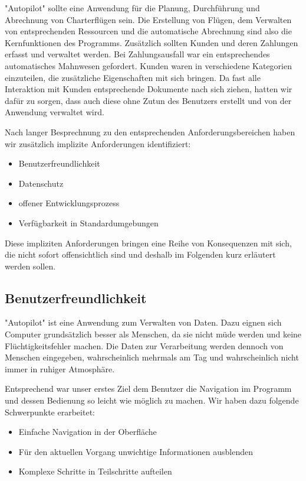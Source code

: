\documentclass[12pt]{article}
\begin{document}
"Autopilot" sollte eine Anwendung für die Planung, Durchführung und Abrechnung von Charterflügen sein. Die Erstellung von Flügen, dem Verwalten von entsprechenden Ressourcen und die automatische Abrechnung sind also die Kernfunktionen des Programms. Zusätzlich sollten Kunden und deren Zahlungen erfasst und verwaltet werden. Bei Zahlungsausfall war ein entsprechendes automatisches Mahnwesen gefordert. Kunden waren in verschiedene Kategorien einzuteilen, die zusätzliche Eigenschaften mit sich bringen. Da fast alle Interaktion mit Kunden entsprechende Dokumente nach sich ziehen, hatten wir dafür zu sorgen, dass auch diese ohne Zutun des Benutzers erstellt und von der Anwendung verwaltet wird.
\newline

Nach langer Besprechnung zu den entsprechenden Anforderungsbereichen haben wir zusätzlich implizite Anforderungen identifiziert:
\begin{itemize}
  \item Benutzerfreundlichkeit
  \item Datenschutz
  \item offener Entwicklungsprozess
  \item Verfügbarkeit in Standardumgebungen
\end{itemize}
\newline

Diese impliziten Anforderungen bringen eine Reihe von Konsequenzen mit sich, die nicht sofort offensichtlich sind und deshalb im Folgenden kurz erläutert werden sollen.

\subsection{Benutzerfreundlichkeit}

"Autopilot" ist eine Anwendung zum Verwalten von Daten. Dazu eignen sich Computer grundsätzlich besser als Menschen, da sie nicht müde werden und keine Flüchtigkeitsfehler machen. Die Daten zur Verarbeitung werden dennoch von Menschen eingegeben, wahrscheinlich mehrmals am Tag und wahrscheinlich nicht immer in ruhiger Atmosphäre.
\newline

Entsprechend war unser erstes Ziel dem Benutzer die Navigation im Programm und dessen Bedienung so leicht wie möglich zu machen. Wir haben dazu folgende Schwerpunkte erarbeitet:
\begin{itemize}
  \item Einfache Navigation in der Oberfläche
  \item Für den aktuellen Vorgang unwichtige Informationen ausblenden
  \item Komplexe Schritte in Teilschritte aufteilen
\end{itemize}
\newline
\end{document}
